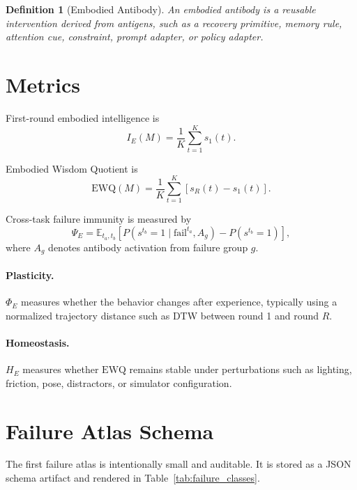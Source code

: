 \documentclass[11pt]{article}
\newtheorem{definition}{Definition}
\begin{document}
\begin{definition}[Embodied Antibody]
An embodied antibody is a reusable intervention derived from antigens, such as a recovery primitive, memory rule, attention cue, constraint, prompt adapter, or policy adapter.
\end{definition}

\section{Metrics}

First-round embodied intelligence is
\[
I_E(M)=\frac{1}{K}\sum_{t=1}^{K}s_1(t).
\]

Embodied Wisdom Quotient is
\[
\mathrm{EWQ}(M)=\frac{1}{K}\sum_{t=1}^{K}[s_R(t)-s_1(t)].
\]

Cross-task failure immunity is measured by
\[
\Psi_E
=\mathbb{E}_{t_a,t_b}\left[
P(s^{t_b}=1\mid \mathrm{fail}^{t_a}, A_g)
-P(s^{t_b}=1)
\right],
\]
where $A_g$ denotes antibody activation from failure group $g$.

\paragraph{Plasticity.}
$\Phi_E$ measures whether the behavior changes after experience, typically using a normalized trajectory distance such as DTW between round 1 and round $R$.

\paragraph{Homeostasis.}
$H_E$ measures whether $\mathrm{EWQ}$ remains stable under perturbations such as lighting, friction, pose, distractors, or simulator configuration.

\section{Failure Atlas Schema}

The first failure atlas is intentionally small and auditable.
It is stored as a JSON schema artifact and rendered in Table~\ref{tab:failure_classes}.

\begin{table}[t]
\centering
\small
\caption{Initial embodied failure classes and typical antigen cues. Generated from the JSON schema.}
\label{tab:failure_classes}

\end{table}
\end{document}
